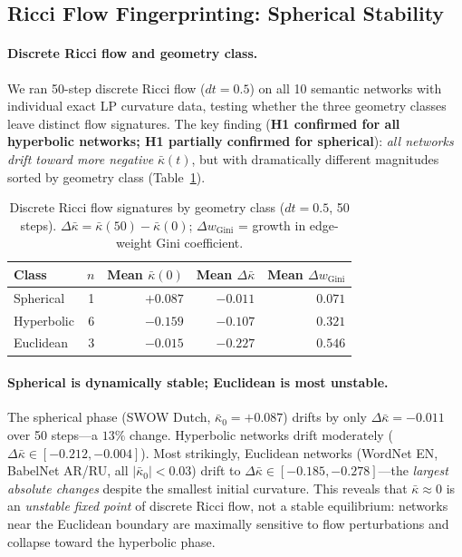 \documentclass[11pt,a4paper]{article}
\newcommand{\kbar}{\bar{\kappa}}
\begin{document}
\subsection{Ricci Flow Fingerprinting: Spherical Stability}
\label{sec:ricci_flow_fingerprint}

\paragraph{Discrete Ricci flow and geometry class.}
We ran 50-step discrete Ricci flow ($dt = 0.5$) on all 10 semantic networks with individual exact LP curvature data, testing whether the three geometry classes leave distinct flow signatures. The key finding (\textbf{H1 confirmed for all hyperbolic networks; H1 partially confirmed for spherical}): \emph{all networks drift toward more negative} $\kbar(t)$, but with dramatically different magnitudes sorted by geometry class (Table~\ref{tab:ricci_flow}).

\begin{table}[h]
\centering
\small
\caption{Discrete Ricci flow signatures by geometry class ($dt=0.5$, 50 steps). $\Delta\kbar = \kbar(50) - \kbar(0)$; $\Delta w_{\mathrm{Gini}}$ = growth in edge-weight Gini coefficient.}
\label{tab:ricci_flow}
\begin{tabular}{@{}lrrrr@{}}
\toprule
Class & $n$ & Mean $\kbar(0)$ & Mean $\Delta\kbar$ & Mean $\Delta w_{\mathrm{Gini}}$ \\
\midrule
Spherical  & 1 & $+0.087$ & $-0.011$ & $0.071$ \\
Hyperbolic & 6 & $-0.159$ & $-0.107$ & $0.321$ \\
Euclidean  & 3 & $-0.015$ & $-0.227$ & $0.546$ \\
\bottomrule
\end{tabular}
\end{table}

\paragraph{Spherical is dynamically stable; Euclidean is most unstable.}
The spherical phase (SWOW Dutch, $\kbar_0 = +0.087$) drifts by only $\Delta\kbar = -0.011$ over 50 steps---a $13\%$ change. Hyperbolic networks drift moderately ($\Delta\kbar \in [-0.212, -0.004]$). Most strikingly, Euclidean networks (WordNet EN, BabelNet AR/RU, all $|\kbar_0| < 0.03$) drift to $\Delta\kbar \in [-0.185, -0.278]$---the \emph{largest absolute changes} despite the smallest initial curvature. This reveals that $\kbar \approx 0$ is an \emph{unstable fixed point} of discrete Ricci flow, not a stable equilibrium: networks near the Euclidean boundary are maximally sensitive to flow perturbations and collapse toward the hyperbolic phase.
\end{document}
